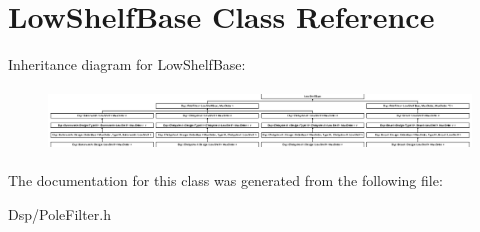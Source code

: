 \hypertarget{classLowShelfBase}{\section{Low\-Shelf\-Base Class Reference}
\label{classLowShelfBase}
}
Inheritance diagram for Low\-Shelf\-Base\-:\begin{figure}[H]
\begin{center}
\leavevmode
\includegraphics[height=1.693548cm]{classLowShelfBase}
\end{center}
\end{figure}


The documentation for this class was generated from the following file\-:\begin{DoxyCompactItemize}
\item 
Dsp/Pole\-Filter.\-h\end{DoxyCompactItemize}
